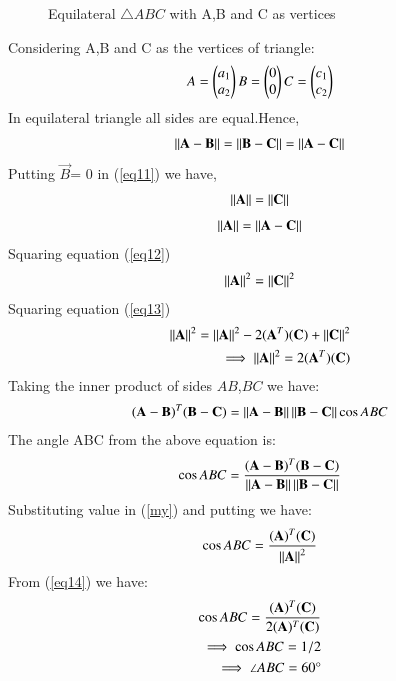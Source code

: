 \documentclass[journal,12pt,twocolumn]{IEEEtran}
\begin{document}
\renewcommand{\thefigure}{1}
\begin{figure}[!ht]
\centering
\resizebox{\columnwidth}{!}{}
\caption{Equilateral $\triangle{ABC}$ with A,B and C as vertices}
\label{fig:tri_right_angle}
\end{figure}
Considering A,B and C as the vertices of triangle:
\begin{align}
   A=
\begin{pmatrix}
a_1\\
a_2
\end{pmatrix}
B=
\begin{pmatrix}
0\\
0
\end{pmatrix}
C=
\begin{pmatrix}
c_1\\
c_2
\end{pmatrix} \nonumber
\end{align}
In equilateral triangle all sides are equal.Hence,
\begin{align}\label{eq11}
\left\lVert\mathbf{A-B}\right\rVert = \left\lVert\mathbf{B-C}\right\rVert = \left\lVert\mathbf{A-C}\right\rVert
\end{align}
Putting $\vec{B}$= 0 in (\ref {eq11}) we have,
\begin{align}\label{eq12}
\left\lVert\mathbf{A}\right\rVert=\left\lVert\mathbf{C}\right\rVert
\end{align}
\begin{align}\label{eq13}
\left\lVert\mathbf{A}\right\rVert=\left\lVert\mathbf{A-C}\right\rVert
\end{align}
Squaring  equation (\ref{eq12})
 \begin{align}\label{eq17}
\left\lVert\mathbf{A}\right\rVert^2=\left\lVert\mathbf{C}\right\rVert^2
\end{align}
Squaring  equation (\ref{eq13})
 \begin{align}\label{eq14}
\left\lVert\mathbf{A}\right\rVert^2=\left\lVert\mathbf{A}\right\rVert^2 - 2(\mathbf{A}^T )(\mathbf{C}) +\left\lVert\mathbf{C}\right\rVert^2 \nonumber \\
\implies \left\lVert\mathbf{A}\right\rVert^2=2(\mathbf{A}^T )(\mathbf{C})
\end{align}
Taking the inner product of sides $AB$,$BC$ we have:
\begin{align}
    (\mathbf{A}-\mathbf{B})^T(\mathbf{B}-\mathbf{C}) =
    \left\lVert\mathbf{A}-\mathbf{B}\right\rVert\left\lVert\mathbf{B}-\mathbf{C}\right\rVert\cos{ABC}
\end{align}
The angle ABC from the  above equation is:
\begin{align}\label{my}
     \cos{ABC} = \frac{(\mathbf{A}-\mathbf{B})^T(\mathbf{B}-\mathbf{C})}{\left\lVert\mathbf{A}-\mathbf{B}\right\rVert\left\lVert\mathbf{B}-\mathbf{C}\right\rVert} 
\end{align}
Substituting value in (\ref{my}) and putting we have:
\begin{align}\label{my1}
     \cos{ABC} = \frac{(\mathbf{A})^T(\mathbf{C})}{\left\lVert\mathbf{A}\right\rVert^2}
\end{align}
From (\ref{eq14}) we have:
\begin{align}\label{my22}
     \cos{ABC} = \frac{(\mathbf{A})^T(\mathbf{C})}{2(\mathbf{A})^T (\mathbf{C})}\nonumber\\
     \implies \cos{ABC} = 1/2\nonumber\\
\implies \angle {ABC =60 \degree}
\end{align}
\end{document}
